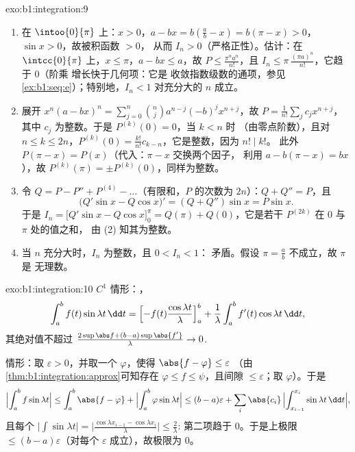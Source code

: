 \begin{solution}{exo:b1:integration:9}
\begin{enumerate}
  \item 在 $\intoo{0}{\pi}$ 上：$x > 0$，$a - bx = b(\frac ab - x) =
        b(\pi - x) > 0$，$\sin x > 0$，故被积函数 $> 0$，
        从而 $I_n > 0$（严格正性）。估计：在
        $\intcc{0}{\pi}$ 上，$x \leq \pi$，$a - bx \leq a$，故 $P
        \leq \frac{\pi^n a^n}{n!}$，且 $I_n \leq
        \pi\,\frac{(\pi a)^n}{n!}$，它趋于 $0$（阶乘
        增长快于几何项：它是
        收敛指数级数的通项，参见
        \cref{ex:b1:seq:e}）；特别地，$I_n < 1$ 对充分大的 $n$ 成立。
  \item 展开 $x^n(a - bx)^n = \sum_{j=0}^{n} \binom nj a^{n-j}
        (-b)^j x^{n+j}$，故 $P = \frac{1}{n!}\sum_j c_j x^{n+j}$，
        其中 $c_j$ 为整数。于是 $P^{(k)}(0) = 0$，当 $k < n$ 时
        （由零点阶数），且对 $n \leq k \leq 2n$，$P^{(k)}(0) =
        \frac{k!}{n!} c_{k-n}$，它是整数，因为 $n! \mid k!$。
        此外 $P(\pi - x) = P(x)$（代入：$\pi - x$ 交换两个因子，
        利用 $a - b(\pi - x) = bx$），故 $P^{(k)}(\pi)
        = \pm P^{(k)}(0)$，同样为整数。
  \item 令 $Q = P - P'' + P^{(4)} - \dots$（有限和，$P$ 的次数为
        $2n$）：$Q + Q'' = P$，且
        \[
        \bigl(Q'\sin x - Q\cos x\bigr)' = (Q + Q'')\sin x = P\sin x .
        \]
        于是 $I_n = \bigl[Q'\sin x - Q\cos x\bigr]_0^{\pi} = Q(\pi)
        + Q(0)$，它是若干 $P^{(2k)}$ 在 $0$ 与 $\pi$ 处的值之和，
        由 (2) 知其为整数。
  \item 当 $n$ 充分大时，$I_n$ 为整数，且 $0 < I_n < 1$：
        矛盾。假设 $\pi = \frac ab$ 不成立，故 $\pi$ 是
        无理数。
\end{enumerate}
\end{solution}

\begin{solution}{exo:b1:integration:10}
$C^1$ 情形：，
\[
\int_a^b f(t)\sin\lambda t\,\dd t
= \Bigl[-f(t)\frac{\cos\lambda t}{\lambda}\Bigr]_a^b
+ \frac{1}{\lambda}\int_a^b f'(t)\cos\lambda t\,\dd t,
\]
其绝对值不超过 $\frac{2\sup\abs f + (b - a)\sup\abs{f'}}
{\lambda} \to 0$.

情形：取 $\varepsilon > 0$，并取一个
$\varphi$，使得 $\abs{f - \varphi} \leq \varepsilon$
（由\cref{thm:b1:integration:approx}可知存在 $\varphi \leq f \leq
\psi$，且间隙 $\leq\varepsilon$；取 $\varphi$）。于是
\[
\Bigl|\int_a^b f\sin\lambda t\Bigr|
\leq \int_a^b \abs{f - \varphi}
+ \Bigl|\int_a^b \varphi \sin\lambda t\Bigr|
\leq (b-a)\varepsilon
+ \sum_i \abs{c_i}\,\Bigl|\int_{x_{i-1}}^{x_i} \sin\lambda t\,\dd
t\Bigr| ,
\]
且每个 $\bigl|\int \sin \lambda t\bigr| = \bigl|\frac{\cos\lambda
x_{i-1} - \cos\lambda x_i}{\lambda}\bigr| \leq \frac{2}{\lambda}$:
第二项趋于 $0$。于是上极限 $\leq
(b-a)\varepsilon$（对每个 $\varepsilon$ 成立），故极限为 $0$。
\end{solution}

